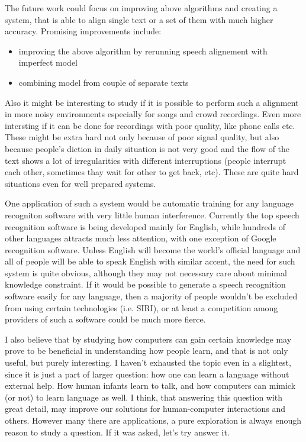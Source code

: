 \documentclass[12pt,a4paper,english]{article}
\begin{document}
The future work could focus on improving above algorithms and creating a system, that is able to align single text or a set of them with much higher accuracy.
Promising improvements include:
\begin{itemize}
    \item improving the above algorithm by rerunning speech alignement with imperfect model
    \item combining model from couple of separate texts
\end{itemize}
Also it might be interesting to study if it is possible to perform such a alignment in more noisy environments especially for songs and crowd recordings. \newline
Even more intersting if it can be done for recordings with poor quality, like phone calls etc. These might be extra hard not only because of poor signal quality, but also because people's diction in daily situation is not very good and the flow of the text shows a lot of irregularities with different interruptions (people interrupt each other, sometimes thay wait for other to get back, etc). \newline
These are quite hard situations even for well prepared systems. \newline

One application of such a system would be automatic training for any language recogniton software with very little human interference. Currently the top speech recognition software is being developed mainly for English, while hundreds of other languages attracts much less attention, with one exception of Google recognition software. Unless English will become the world's official language and all of people will be able to speak English with similar accent, the need for such system is quite obvious, although they may not necessary care about minimal knowledge constraint. \newline
If it would be possible to generate a speech recognition software easily for any language, then a majority of people wouldn't be excluded from using certain technologies (i.e. SIRI), or at least a competition among providers of such a software could be much more fierce. \newline

I also believe that by studying how computers can gain certain knowledge may prove to be beneficial in understanding how people learn, and that is not only useful, but purely interesting. \newline
I haven't exhausted the topic even in a slightest, since it is just a part of larger question: how one can learn a language without external help. How human infants learn to talk, and how computers can mimick (or not) to learn language as well. \newline
I think, that answering this question with great detail, may improve our solutions for human-computer interactions and others. \newline
However many there are applications, a pure exploration is always enough reason to study a question. If it was asked, let's try answer it. \newline
\end{document}
